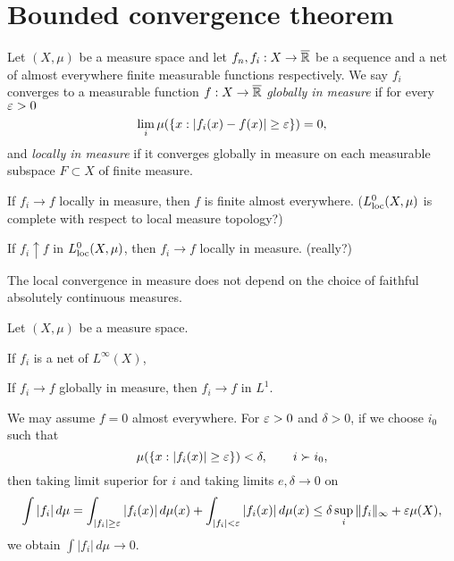 \documentclass{../../large}
\begin{document}
\section{Bounded convergence theorem}





\begin{prb}
Let $(X,\mu)$ be a measure space and let $f_n,f_i:X\to\overline{\mathbb{R}}$ be a sequence and a net of almost everywhere finite measurable functions respectively.
We say $f_i$ converges to a measurable function $f:X\to\overline{\mathbb{R}}$ \emph{globally in measure} if for every $\varepsilon>0$
\[\lim_i\mu(\{x:|f_i(x)-f(x)|\ge\varepsilon\})=0,\]
and \emph{locally in measure} if it converges globally in measure on each measurable subspace $F\subset X$ of finite measure.
\begin{parts}
\item If $f_i\to f$ locally in measure, then $f$ is finite almost everywhere. ($L_{\mathrm{loc}}^0(X,\mu)$ is complete with respect to local measure topology?)
\item If $f_i\uparrow f$ in $L_{\mathrm{loc}}^0(X,\mu)$, then $f_i\to f$ locally in measure. (really?)
\item The local convergence in measure does not depend on the choice of faithful absolutely continuous measures.
\end{parts}
\end{prb}
\begin{pf}
\end{pf}


\begin{prb}
Let $(X,\mu)$ be a measure space.

If $f_i$ is a net of $L^\infty(X)$,

\begin{parts}
\item If $f_i\to f$ globally in measure, then $f_i\to f$ in $L^1$.
\item
\end{parts}
\end{prb}
\begin{pf}
We may assume $f=0$ almost everywhere.
For $\varepsilon>0$ and $\delta>0$, if we choose $i_0$ such that
\[\mu(\{x:|f_i(x)|\ge\varepsilon\})<\delta,\qquad i\succ i_0,\]
then taking limit superior for $i$ and taking limits $e,\delta\to0$ on
\[\int|f_i|\,d\mu=\int_{|f_i|\ge\varepsilon}|f_i(x)|\,d\mu(x)+\int_{|f_i|<\varepsilon}|f_i(x)|\,d\mu(x)\le\delta\sup_i\|f_i\|_\infty+\varepsilon\mu(X),\]
we obtain $\int|f_i|\,d\mu\to0$.

\end{pf}
\end{document}
